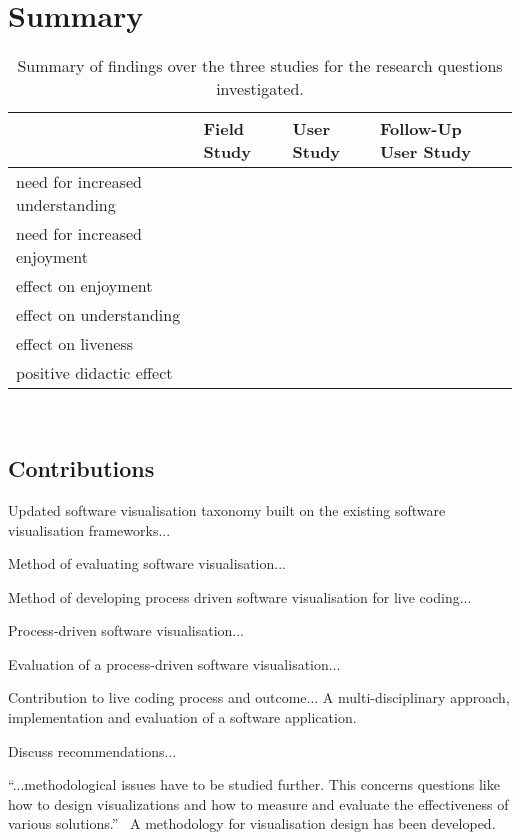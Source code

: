 
\chapter{Summary}
\label{chap:summary}

\begin{center}
\begin{table}
\begin{tabular}{ l l l l}
\hline 
 & Field Study & User Study & Follow-Up User Study\\
\hline 
need for increased understanding & & & \\
\hline 
need for increased enjoyment & & & \\
\hline 
effect on enjoyment & & & \\
\hline 
effect on understanding & & & \\
\hline 
effect on liveness & & & \\
\hline 
positive didactic effect & & & \\
\hline
\end{tabular}\\
\caption{Summary of findings over the three studies for the research questions investigated.}
\label{table:findings}
\end{table}
\end{center}

\section{Contributions}

Updated software visualisation taxonomy built on the existing software visualisation frameworks...

Method of evaluating software visualisation...

Method of developing process driven software visualisation for live coding...

Process-driven software visualisation...

Evaluation of a process-driven software visualisation...

Contribution to live coding process and outcome... A multi-disciplinary approach, implementation and evaluation of a software application.

Discuss recommendations...

``...methodological issues have to be studied further. This concerns questions like how to design visualizations and how to measure and evaluate the effectiveness of various solutions.''~\cite{VanWijk2005} A methodology for visualisation design has been developed.


